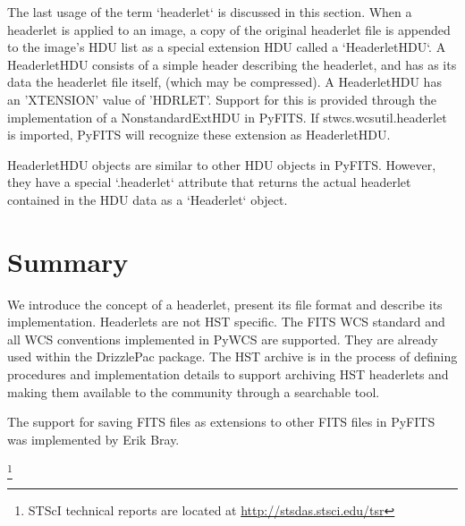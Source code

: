 \documentclass[11pt,twoside]{article}
\begin{document}
The last usage of the term `headerlet` is discussed in this section.
When a headerlet is applied to an image, a copy of the original 
headerlet file is appended to the image's HDU list as a special extension
HDU called a `HeaderletHDU`. A HeaderletHDU consists of a simple header
describing the headerlet, and has as its data the headerlet file itself,
(which may be compressed). A HeaderletHDU has an 'XTENSION' 
value of 'HDRLET'. Support for this is provided through the implementation
of a NonstandardExtHDU in PyFITS. If stwcs.wcsutil.headerlet is imported,
PyFITS will recognize these extension as HeaderletHDU.

HeaderletHDU objects are similar to other HDU objects in PyFITS.
However, they have a special `.headerlet` attribute that returns
the actual headerlet contained in the HDU data as a `Headerlet` object.

\section{Summary}
We introduce the concept of a headerlet, present its file format
and describe its implementation. Headerlets are not HST specific.
The FITS WCS standard and all WCS conventions implemented in PyWCS
are supported. They are already used within the DrizzlePac package. 
The HST archive is in the process of defining procedures and 
implementation details to support archiving HST headerlets and making
them available to the community through a searchable tool.

\acknowledgements The support for saving FITS files as extensions to other FITS files in PyFITS was implemented by Erik Bray.

 

\footnote{STScI technical reports are located at \url{http://stsdas.stsci.edu/tsr}}
\end{document}
